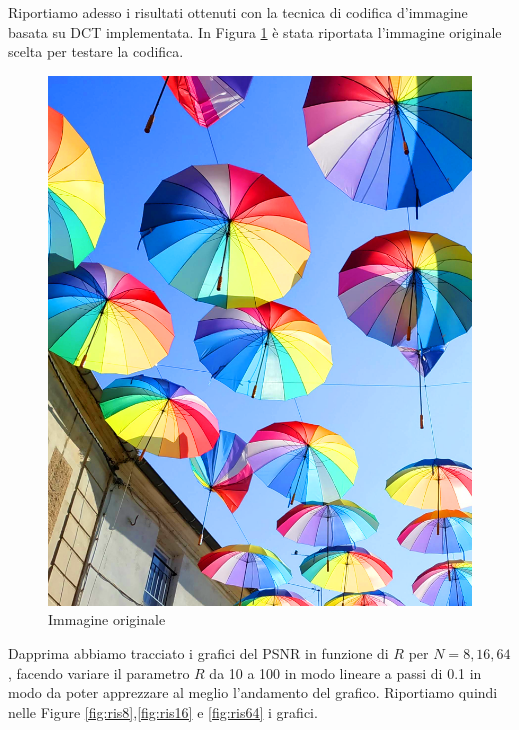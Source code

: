 Riportiamo adesso i risultati ottenuti con la tecnica di codifica d'immagine basata su DCT implementata. In Figura \ref{fig:original} è stata riportata l'immagine originale scelta per testare la codifica.
\begin{figure}[H]
    \centering
    \includegraphics[width=0.65\linewidth]{Original.png}
    \caption{Immagine originale}
    \label{fig:original}
\end{figure}
Dapprima abbiamo tracciato i grafici del PSNR in funzione di $R$ per $N=8,16,64$, facendo variare il parametro $R$ da 10 a 100 in modo lineare a passi di 0.1 in modo da poter apprezzare al meglio l'andamento del grafico. Riportiamo quindi nelle Figure \ref{fig:ris8},\ref{fig:ris16} e \ref{fig:ris64} i grafici.
